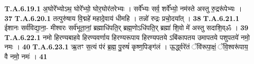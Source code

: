 \documentclass[17pt]{extarticle}
\begin{document}
                  \newline
                                                         \textbf{} \newline \newline
                                \textbf{ T.A.6.19.1} \newline
                  अ॒घोरे᳚भ्योऽथ॒ घोरे᳚भ्यो॒ घोर॒घोर॑तरेभ्यः ।  सर्वे᳚भ्यः सर्व॒ शर्वे᳚भ्यो॒ नम॑स्ते अस्तु रु॒द्ररू॑पेभ्यः । \textbf{ 37} \newline
                  \newline
                                                         \textbf{} \newline \newline
                                \textbf{ T.A.6.20.1} \newline
                  तत्पुरु॑षाय वि॒द्महे॑ महादे॒वाय॑ धीमहि ।  तन्नो॑ रुद्रः प्रचो॒दया᳚त् । \textbf{ 38} \newline
                  \newline
                                                         \textbf{} \newline \newline
                                \textbf{ T.A.6.21.1} \newline
                  ईशानः सर्व॑विद्या॒ना॒- मीश्वरः सर्व॑भूता॒नां॒ ब्रह्माधि॑पति॒र् ब्रह्म॒णोऽधि॑पति॒र् ब्रह्मा॑ शि॒वो मे॑ अस्तु सदाशि॒व्ॐ । \textbf{ 39} \newline
                  \newline
                                                         \textbf{} \newline \newline
                                \textbf{ T.A.6.22.1} \newline
                  नमो हिरण्यबाहवे हिरण्यवर्णाय हिरण्यरूपाय हिरण्यपतये ऽबिंकापतय उमापतये पशुपतये॑ नमो॒ नमः । \textbf{ 40} \newline
                  \newline
                                                         \textbf{} \newline \newline
                                \textbf{ T.A.6.23.1} \newline
                  ऋ॒तꣳ स॒त्यं प॑रं ब्र॒ह्म॒ पु॒रुषं॑ कृष्ण॒पिङ्ग॑लं । ऊ॒र्द्ध्वरे॑तं ॅवि॑रूपा॒क्षं॒ ॅवि॒श्वरू॑पाय॒ वै नमो॒ नमः॑ । \textbf{ 41} \newline
                  \newline
\end{document}
